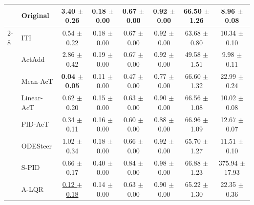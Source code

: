 \documentclass{article}
\theoremstyle{plain}
\theoremstyle{definition}
\theoremstyle{remark}
\begin{document}
\begin{table}[H]
\begin{threeparttable}
\begin{tabular}{ll|>{\columncolor{lightblue}}c|ccc|c|c}
    \midrule

    & Original &  3.40 {\tiny $\pm$0.26} & 0.18 {\tiny $\pm$0.00} & 0.67 {\tiny $\pm$0.00} & 0.92 {\tiny $\pm$0.00} & 66.50 {\tiny $\pm$1.26} & 8.96 {\tiny $\pm$0.08} \\
    \cmidrule(lr){2-8}
    \multirow{8}{*}{\rotatebox{90}{Qwen-2.5-3B}} 
    & ITI & 0.54 {\tiny $\pm$0.22} & 0.18 {\tiny $\pm$0.00} & 0.67 {\tiny $\pm$0.00} & 0.92 {\tiny $\pm$0.00} & 63.68 {\tiny $\pm$0.80} & 10.34 {\tiny $\pm$0.10} \\
    & ActAdd & 2.86 {\tiny $\pm$0.42} & 0.19 {\tiny $\pm$0.00} & 0.67 {\tiny $\pm$0.00} & 0.92 {\tiny $\pm$0.00} & 49.58 {\tiny $\pm$1.51} & 9.98 {\tiny $\pm$0.11} \\
    & Mean-AcT & \textbf{0.04 {\tiny $\pm$0.05}} & 0.11 {\tiny $\pm$0.00} & 0.47 {\tiny $\pm$0.00} & 0.77 {\tiny $\pm$0.00} & 66.60 {\tiny $\pm$1.32} & 22.99 {\tiny $\pm$0.24} \\
    & Linear-AcT & 0.62 {\tiny $\pm$0.20} & 0.15 {\tiny $\pm$0.00} & 0.63 {\tiny $\pm$0.00} & 0.90 {\tiny $\pm$0.00} & 66.56 {\tiny $\pm$1.08} & 10.02 {\tiny $\pm$0.08} \\
    & PID-AcT & 0.34 {\tiny $\pm$0.11} & 0.16 {\tiny $\pm$0.00} & 0.60 {\tiny $\pm$0.00} & 0.88 {\tiny $\pm$0.00} & 66.96 {\tiny $\pm$1.09} & 12.67 {\tiny $\pm$0.07} \\
    & ODESteer &  1.02 {\tiny $\pm$0.34} & 0.18 {\tiny $\pm$0.00} & 0.66 {\tiny $\pm$0.00} & 0.92 {\tiny $\pm$0.00} & 65.70 {\tiny $\pm$1.27} & 11.51 {\tiny $\pm$0.10} \\
    & S-PID & 0.66 {\tiny $\pm$0.17} & 0.40 {\tiny $\pm$0.00} & 0.84 {\tiny $\pm$0.00} & 0.98 {\tiny $\pm$0.00} & 66.88 {\tiny $\pm$1.23} & 375.94 {\tiny $\pm$17.93} \\
    & A-LQR &  \underline{0.12 {\tiny $\pm$0.18} }& 0.14 {\tiny $\pm$0.00} & 0.63 {\tiny $\pm$0.00} & 0.90 {\tiny $\pm$0.00} & 65.22 {\tiny $\pm$1.30} & 22.35 {\tiny $\pm$0.36} \\
    \midrule
    



\end{tabular}
\end{threeparttable}
\end{table}
\end{document}
